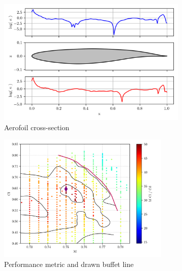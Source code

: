 \documentclass[11pt]{article}
\begin{document}
\begin{figure}
    \centering
    \begin{subfigure}[t]{0.48\textwidth}
        \centering
        \includegraphics[width=\textwidth]{figures/airfoil.png}
        \caption{Aerofoil cross-section}
        \label{fig:airfoil}
    \end{subfigure}
    \begin{subfigure}[t]{0.48\textwidth}
        \centering
        \includegraphics[width=0.9\textwidth]{figures/performance_metric.png}
        \caption{Performance metric and drawn buffet line}
        \label{fig:performance_metric}
    \end{subfigure}
    \caption{}
\end{figure}
\end{document}
